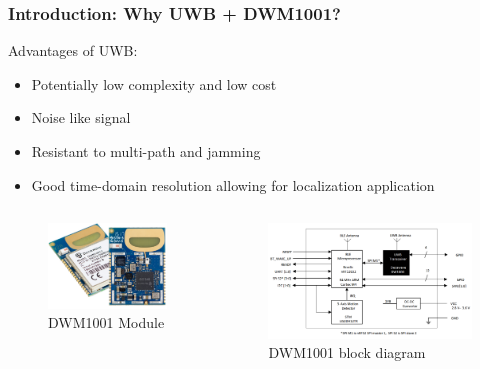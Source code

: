 \documentclass[10pt]{beamer}
\begin{document}
\begin{frame}
    \frametitle{Introduction: Why UWB + DWM1001?}
    Advantages of UWB:
    \begin{itemize}
        \item Potentially low complexity and low cost
        \item Noise like signal
        \item Resistant to multi-path and jamming
        \item Good time-domain resolution allowing for localization application
    \end{itemize}
    \begin{columns}
        \begin{figure}[H]
            \centering
            \includegraphics[width=1\textwidth]{DWM1001_Module_ProdPage_600x430.jpg}
            \caption{DWM1001 Module}
            \label{fig:DWM1001_Module_ProdPage_600x430}
        \end{figure}
        \begin{figure}[H]
            \centering
            \includegraphics[width=1\textwidth]{dwm1001_block_diagram.png}
            \caption{DWM1001 block diagram}
            \label{fig:dwm1001_block_diagram}
        \end{figure}
    \end{columns}
\end{frame}
\end{document}

